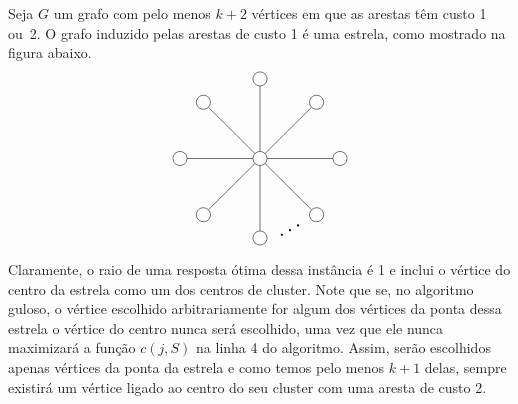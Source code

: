 Seja $G$ um grafo com pelo menos $k+2$ vértices em que as arestas têm custo 1 ou~2. O grafo induzido pelas arestas de custo 1 é uma estrela, como mostrado na figura abaixo.
\[
\begin{tikzpicture}
    \def\n{8}
    
    \def\r{2cm}
    
    \def\rotationangle{90}
    
    \draw (0,0) node[circle, draw, minimum size=10pt, inner sep=1.5pt] (center) {};
    
    \begin{scope}[rotate=\rotationangle]
      \foreach \i in {1,...,\n} {
        \draw (\i*360/\n:\r) node[circle, draw, minimum size=10pt, inner sep=1.5pt] (\i) {};
      }
    \end{scope}
    
    \foreach \i in {1,...,\n} {
      \draw (center) -- (\i);
    }
    \draw (4) node[shift={(0.75,0.2)}] {\rotatebox{30}{\scalebox{1.5}{$\ldots$}}} (4);
  \end{tikzpicture}
  \]

  Claramente, o raio de uma resposta ótima dessa instância é 1 e inclui o vértice do centro da estrela como um dos centros de cluster.
  Note que se, no algoritmo guloso, o vértice escolhido arbitrariamente for algum dos vértices da ponta dessa estrela o vértice do centro nunca será escolhido, uma vez que ele nunca maximizará a função $c(j,S)$ na linha 4 do algoritmo. Assim, serão escolhidos apenas vértices da ponta da estrela e como temos pelo menos $k+1$ delas, sempre existirá um vértice ligado ao centro do seu cluster com uma aresta de custo 2.
